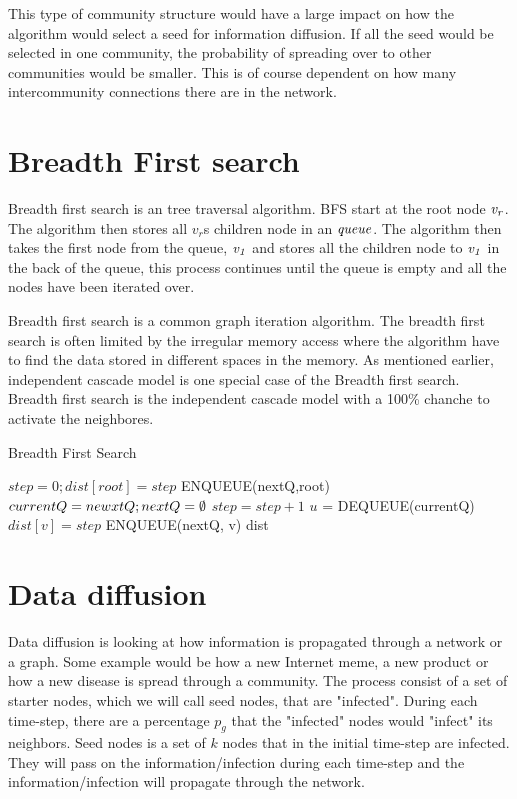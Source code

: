 This type of community structure would have a large impact on how the algorithm would select a seed for information diffusion. If all the seed would be selected in one community, the probability of spreading over to other communities would be smaller. This is of course dependent on how many intercommunity connections there are in the network.

\section{Breadth First search}
Breadth first search is an tree traversal algorithm. BFS start at the root node $\it{v_r}$. The algorithm then stores all $v_r$s children node in an $\it{queue}$. The algorithm then takes the first node from the queue, $\it{v_1}$ and stores all the children node to $\it{v_1}$ in the back of the queue, this process continues until the queue is empty and all the nodes have been iterated over. 

Breadth first search is a common graph iteration algorithm. The breadth first search is often limited by the irregular memory access where the algorithm have to find the data stored in different spaces in the memory. As mentioned earlier, independent cascade model is one special case of the Breadth first search. Breadth first search is the independent cascade model with a 100\% chanche to activate the neighbores.

\begin{algorithm}
\caption{Breadth First Search}
\begin{algorithmic}[1]
\State $step = 0; dist[root] = step$
\State ENQUEUE(nextQ,root)
\State $currentQ = newxtQ; nextQ = \emptyset$
\State $step = step+1$
\State$ u$ = DEQUEUE(currentQ)
\State $dist[v] = step$
\State ENQUEUE(nextQ, v)
\EndIf
\EndFor
\EndWhile
\EndWhile
\Return dist
\end{algorithmic}
\end{algorithm}


\section{Data diffusion}
Data diffusion is looking at how information is propagated through a network or a graph. Some example would be how a new Internet meme, a new product or how a new disease is spread through a community. The process consist of a set of starter nodes, which we will call seed nodes, that are "infected". During each time-step, there are a percentage $p_g$ that the "infected" nodes would "infect" its neighbors. Seed nodes is a set of $k$ nodes that in the initial time-step are infected. They will pass on the information/infection during each time-step and the information/infection will propagate through the network. 
 
